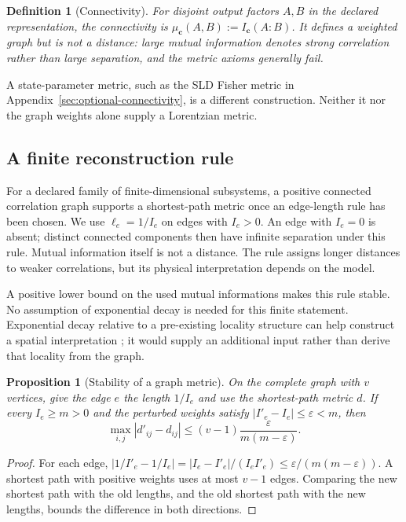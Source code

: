 \documentclass[12pt,a4paper]{article}
\newtheorem{proposition}[theorem]{Proposition}
\newtheorem{definition}[theorem]{Definition}
\begin{document}
\begin{definition}[Connectivity]
\label{def:connectivity}
For disjoint output factors $A,B$ in the declared representation,
the connectivity is $\mu_{\mathbf c}(A,B):=I_{\mathbf c}(A:B)$.
It defines a weighted graph but is not a distance: large mutual
information denotes strong correlation rather than large separation,
and the metric axioms generally fail.
\end{definition}

A state-parameter metric, such as the SLD Fisher metric in
Appendix~\ref{sec:optional-connectivity}, is a different construction.
Neither it nor the graph weights alone supply a Lorentzian metric.

\subsection{A finite reconstruction rule}

For a declared family of finite-dimensional subsystems, a positive
connected correlation graph supports a shortest-path metric once an
edge-length rule has been chosen. We use $\ell_e=1/I_e$ on edges with
$I_e>0$. An edge with $I_e=0$ is absent; distinct connected components
then have infinite separation under this rule. Mutual information
itself is not a distance. The rule assigns longer distances to weaker
correlations, but its physical interpretation depends on the model.

A positive lower bound on the used mutual informations makes this rule
stable. No assumption of exponential decay is needed for this finite
statement. Exponential decay relative to a pre-existing locality
structure can help construct a spatial interpretation
\cite{Hastings2007,Eisert2010}; it would supply an additional input
rather than derive that locality from the graph.

\begin{proposition}[Stability of a graph metric]
\label{prop:stability}
On the complete graph with $v$ vertices, give the edge $e$ the length $1/I_e$ and use the shortest-path metric $d$. If every $I_e\ge m>0$ and the perturbed weights satisfy $|I'_e-I_e|\le\varepsilon<m$, then
\[
\max_{i,j}|d'_{ij}-d_{ij}|\le(v-1)\frac{\varepsilon}{m(m-\varepsilon)} .
\]
\end{proposition}

\begin{proof}
For each edge, $|1/I'_e-1/I_e|=|I_e-I'_e|/(I_eI'_e)\le\varepsilon/(m(m-\varepsilon))$. A shortest path with positive weights uses at most $v-1$ edges. Comparing the new shortest path with the old lengths, and the old shortest path with the new lengths, bounds the difference in both directions.
\end{proof}
\end{document}

